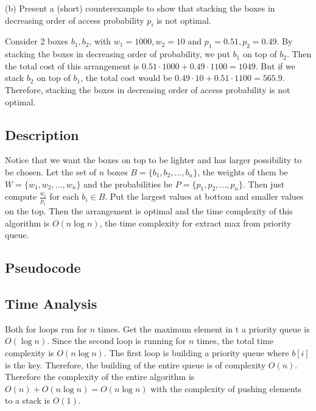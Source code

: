 \documentclass[11pt, oneside]{article}   	%
\begin{document}
(b) Present a (short) counterexample to show that stacking the boxes in decreasing order of
access probability $p_i$ is not optimal.

Consider 2 boxes $b_1, b_2$, with $w_1 = 1000, w_2 = 10$ and $p_1 = 0.51, p_2 = 0.49$. By stacking the boxes in decreasing order of probability, we put $b_1$ on top of $b_2$. Then the total cost of this arrangement is $0.51 \cdot 1000 + 0.49 \cdot 1100 = 1049$. But if we stack $b_2$ on top of $b_1$, the total cost would be $0.49 \cdot 10 + 0.51 \cdot 1100 = 565.9$. Therefore, stacking the boxes in decreasing order of
access probability is not optimal.
\subsection{Description}
Notice that we want the boxes on top to be lighter and has larger possibility to be chosen. Let the set of $n$ boxes $B = \{b_1,b_2,...,b_n\}$, the weights of them be $W = \{w_1,w_2,...,w_n\}$ and the probabilities be $P = \{p_1,p_2,...,p_n\}$. Then just compute $\frac{w_i}{p_i}$ for each $b_i \in B$. Put the largest values at bottom and smaller values on the top. Then the arrangement is optimal and the time complexity of this algorithm is $O(n\log n)$, the time complexity for extract max from priority queue.

\subsection{Pseudocode}
\begin{algorithm}
\end{algorithm}
\subsection{Time Analysis}
Both for loops run for $n$ times. Get the maximum element in t a priority queue is $O(\log n)$. Since the second loop is running for $n$ times, the total time complexity is $O(n\log n)$. The first loop is building a priority queue where $b[i]$ is the key. Therefore, the building of the entire queue is of complexity $O(n)$. Therefore the complexity of the entire algorithm is $O(n)+O(n\log n) = O(n\log n)$ with the complexity of pushing elements to a stack is $O(1)$.
\end{document}
